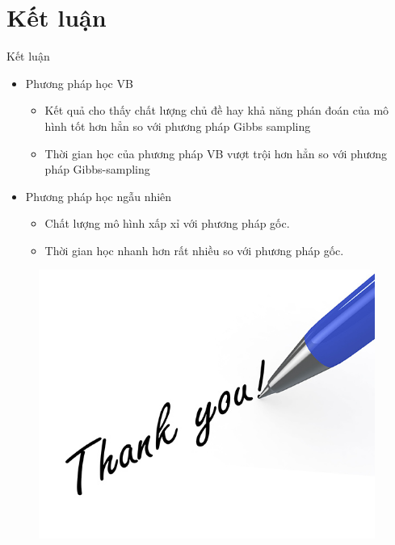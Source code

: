 \documentclass[pdf]{beamer}
\begin{document}
\section{Kết luận}
	\begin{frame}{Kết luận}
		\begin{itemize}
			\item Phương pháp học VB 
			\begin{itemize}
				\item  Kết quả cho thấy chất lượng chủ đề hay khả năng phán đoán của mô hình tốt hơn hẳn so với  phương pháp Gibbs sampling
				\item  Thời gian học của phương pháp VB vượt trội hơn hẳn so với phương pháp Gibbs-sampling
			\end{itemize}
		\item Phương pháp học ngẫu nhiên
			\begin{itemize}
				\item Chất lượng mô hình xấp xỉ với phương pháp gốc.
				\item Thời gian học nhanh hơn rất nhiều so với phương pháp gốc.
			\end{itemize}
		\end{itemize}
	\end{frame}

\begin{figure}
	\begin{center}
		\includegraphics[width=110mm]{thankyou.jpg}
	\end{center}
\end{figure}
\end{document}
